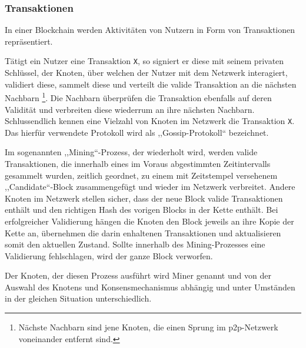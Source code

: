     \subsubsection{Transaktionen}
    \label{sec:sota_blockchain_trx}
    In einer Blockchain werden Aktivitäten von Nutzern in Form von Transaktionen repräsentiert. 
    
    Tätigt ein Nutzer eine Transaktion \lstinline{X}, so signiert er diese mit seinem privaten Schlüssel, der Knoten, über welchen der Nutzer mit dem Netzwerk interagiert, validiert diese, sammelt diese und verteilt die valide Transaktion an die nächsten Nachbarn
    \!\footnote{Nächste Nachbarn sind jene Knoten, die einen Sprung im \gls{p2p}-Netzwerk voneinander entfernt sind.}.
    Die Nachbarn überprüfen die Transaktion ebenfalls auf deren Validität und verbreiten diese wiederrum an ihre nächsten Nachbarn. 
    Schlussendlich kennen eine Vielzahl von Knoten im Netzwerk die Transaktion \lstinline{X}. 
    Das hierfür verwendete Protokoll wird als ,,Gossip-Protokoll`` bezeichnet.\cite{Christidis2016}
    
    Im sogenannten ,,Mining``-Prozess, der wiederholt wird, werden valide Transaktionen, die innerhalb eines im Voraus abgestimmten Zeitintervalls gesammelt wurden, zeitlich geordnet, zu einem mit Zeitstempel versehenem ,,Candidate``-Block zusammengefügt und wieder im Netzwerk verbreitet. 
    Andere Knoten im Netzwerk stellen sicher, dass der neue Block valide Transaktionen enthält und den richtigen Hash des vorigen Blocks in der Kette enthält. 
    Bei erfolgreicher Validierung hängen die Knoten den Block jeweils an ihre Kopie der Kette an, übernehmen die darin enhaltenen Transaktionen und aktualisieren somit den aktuellen Zustand. 
    Sollte innerhalb des Mining-Prozesses eine Validierung fehlschlagen, wird der ganze Block verworfen.\cite{Christidis2016}
    
    Der Knoten, der diesen Prozess ausführt wird Miner genannt und von der Auswahl des Knotens und Konsensmechanismus abhängig und unter Umständen in der gleichen Situation unterschiedlich.\cite{Christidis2016}
    
